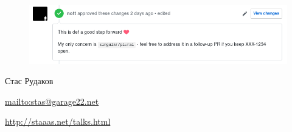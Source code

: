 \documentclass[10pt,pdf,utf8,aspectratio=169,xcolor=dvipsnames,x11names,center]{beamer}
\begin{document}
\begin{frame}
  \begin{figure}
    \includegraphics[scale=0.5]{approve}
  \end{figure}
\end{frame}

\begin{frame}
    \begin{block}{Стас Рудаков}
    \par \url{mailto:stas@garage22.net}
    \par \url{http://staaas.net/talks.html}
    \end{block}
\end{frame}
\end{document}
